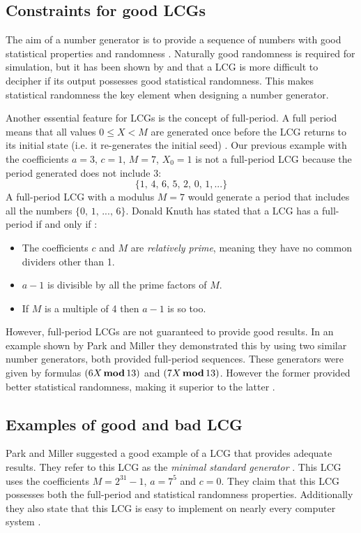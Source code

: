\subsection{Constraints for good LCGs}
The aim of a number generator is to provide a sequence of numbers with good statistical properties and randomness \citep{hamid_lcgSecurity}. Naturally good randomness is required for simulation, but it has been shown by \citep{Knuth_decipher} and \citep{plumstead_predicting} that a LCG is more difficult to decipher if its output possesses good statistical randomness. This  makes statistical randomness the key element when designing a number generator.

Another essential feature for LCGs is the concept of full-period. A full period means that all values $0\leq X<M$ are generated once before the LCG returns to its initial state (i.e. it re-generates the initial seed) \citep{Knuth_art2}. Our previous example with the coefficients $a = 3$, $c = 1$, $M = 7$, $X_0=1$ is not a full-period LCG because the period generated does not include $3$:
\[\{1,\,4,\,6,\,5,\,2,\,0,\,1,...\}\]
A full-period LCG with a modulus $M=7$ would generate a period that includes all the numbers $\{0,\,1,\,...,\,6\}$. Donald Knuth has stated that a LCG has a full-period if and only if \citep{Knuth_art2}:
\begin{itemize}
\item The coefficients $c$ and $M$ are {\em relatively prime}, meaning they have no common dividers other than 1.
\item $a-1$ is divisible by all the prime factors of $M$.
\item If $M$ is a multiple of 4 then $a-1$ is so too.
\end{itemize}
However, full-period LCGs are not guaranteed to provide good results. In an example shown by Park and Miller they demonstrated this by using two similar number generators, both provided full-period sequences. These generators were given by formulas \((6 X \, \textbf{mod} \, 13)\) and \((7 X \, \textbf{mod} \, 13)\). However the former provided better statistical randomness, making it superior to the latter \citep{park_miller}.


\subsection{Examples of good and bad LCG}
Park and Miller suggested a good example of a LCG that provides adequate results. They refer to this LCG as the {\em minimal standard generator} \citep{park_miller}. This LCG uses the coefficients $M = 2^{31}-1$, $a = 7^5$ and $c = 0$. They claim that this LCG possesses both the full-period and statistical randomness properties. Additionally they also state that this LCG is easy to implement on nearly every computer system \citep{park_miller}.

